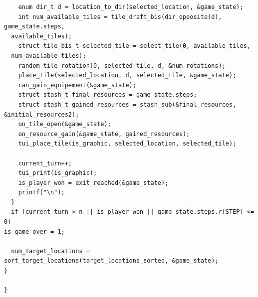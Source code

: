 \begin{verbatim}
    enum dir_t d = location_to_dir(selected_location, &game_state);
    int num_available_tiles = tile_draft_bis(dir_opposite(d), game_state.steps, 
  available_tiles);
    struct tile_bis_t selected_tile = select_tile(0, available_tiles, 
  num_available_tiles);
    random_tile_rotation(0, selected_tile, d, &num_rotations);
    place_tile(selected_location, d, selected_tile, &game_state);
    can_gain_equipement(&game_state);
    struct stash_t final_resources = game_state.steps;
    struct stash_t gained_resources = stash_sub(&final_resources, &initial_resources2);
    on_tile_open(&game_state);
    on_resource_gain(&game_state, gained_resources);
    tui_place_tile(is_graphic, selected_location, selected_tile);

    current_turn++;
    tui_print(is_graphic);
    is_player_won = exit_reached(&game_state);
    printf("\n");
  }
  if (current_turn > n || is_player_won || game_state.steps.r[STEP] <= 0) 
is_game_over = 1;
  
  num_target_locations = sort_target_locations(target_locations_sorted, &game_state);
}

}
\end{verbatim}
